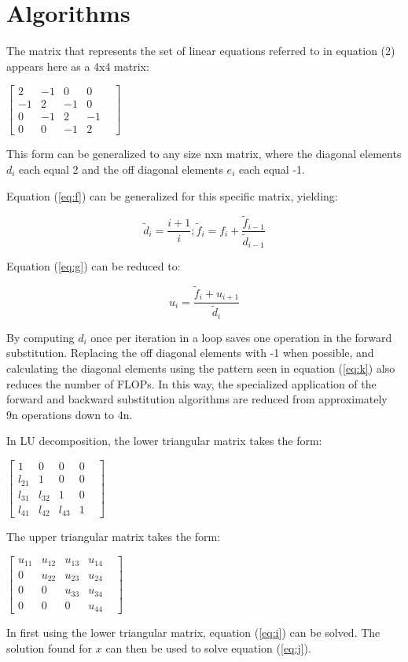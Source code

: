 \documentclass[10pt,showpacs,preprintnumbers,footinbib,amsmath,amssymb,aps,prl,twocolumn,groupedaddress,superscriptaddress,showkeys]{revtex4-1}
\begin{document}
\section{Algorithms} \label{sec:algo}	

The matrix that represents the set of linear equations referred to in equation (2) appears here as a 4x4 matrix:
\begin{center}
		$\begin{bmatrix}
			2 & -1 & 0 & 0 \\
			-1 & 2 & -1 & 0 & \\
			0 & -1 & 2 & -1   \\
			0 & 0 & -1 & 2 
		\end{bmatrix}$
		 
		\end{center}
This form can be generalized to any size nxn matrix, where the diagonal elements $d_{i}$ each equal 2 and the off diagonal elements $e_{i}$ each equal -1.

Equation (\ref{eq:f})
 can be generalized for this specific matrix, yielding: 

	\begin{equation}
        \label{eq:k}
	\tilde{d}_{i}=\frac{i+1}{i};  
	\tilde{f}_{i}=f_{i}+\frac{\tilde{f}_{i-1}}{\tilde{d}_{i-1}}
	\end{equation}

Equation (\ref{eq:g})
 can be reduced to:

	\begin{equation}
	u_{i} = \frac{\tilde{f}_{i}+u_{i+1}}{\tilde{d}_{i}}
	\end{equation}

By computing $d_{i}$ once per iteration in a loop saves one operation in the forward substitution. Replacing the off diagonal elements with -1 when possible, and calculating the diagonal elements using the pattern seen in equation %
(\ref{eq:k}) also reduces the number of FLOPs. In this way, the specialized application of the forward and backward substitution algorithms are reduced from approximately 9n operations down to 4n.

In LU decomposition, the lower triangular matrix takes the form:
\begin{center}
$\begin{bmatrix}
			1 & 0 & 0 & 0 \\
			l_{21} & 1 & 0 & 0 & \\
			l_{31} &l_{32}& 1 & 0   \\
			l_{41}&l_{42}&l_{43}& 1 
\end{bmatrix}$
\end{center}
The upper triangular matrix takes the form:
\begin{center}
$\begin{bmatrix}
			u_{11}&u_{12}&u_{13}&u_{14}\\
			0 & u_{22} & u_{23}& u_{24} & \\
			0 & 0 & u_{33} & u_{34}   \\
			0 & 0 & 0 & u_{44}
\end{bmatrix}$
\end{center}
In first using the lower triangular matrix, equation (\ref{eq:i}) can be solved. The solution found for $x$ can then be used to solve equation (\ref{eq:j}).	
\end{document}
